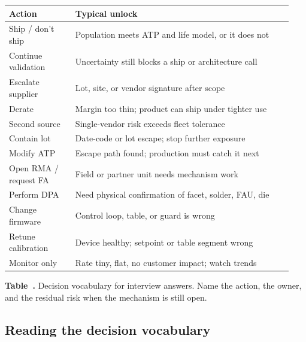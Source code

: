 \begin{table}[ht]
\label{tab:interview-decisions}%
\centering
\setlength{\tabcolsep}{4pt}%
\footnotesize
\renewcommand{\arraystretch}{1.25}%
\begin{tabular}{@{}p{0.22\linewidth}p{0.72\linewidth}@{}}
\toprule
Action & Typical unlock \\
\midrule
Ship / don't ship & Population meets ATP and life model, or it does not \\
\addlinespace[1.5em]
Continue validation & Uncertainty still blocks a ship or architecture call \\
\addlinespace[1.5em]
Escalate supplier & Lot, site, or vendor signature after scope \\
\addlinespace[1.5em]
Derate & Margin too thin; product can ship under tighter use \\
\addlinespace[1.5em]
Second source & Single-vendor risk exceeds fleet tolerance \\
\addlinespace[1.5em]
Contain lot & Date-code or lot escape; stop further exposure \\
\addlinespace[1.5em]
Modify ATP & Escape path found; production must catch it next \\
\addlinespace[1.5em]
Open RMA / request FA & Field or partner unit needs mechanism work \\
\addlinespace[1.5em]
Perform DPA & Need physical confirmation of facet, solder, FAU, die \\
\addlinespace[1.5em]
Change firmware & Control loop, table, or guard is wrong \\
\addlinespace[1.5em]
Retune calibration & Device healthy; setpoint or table segment wrong \\
\addlinespace[1.5em]
Monitor only & Rate tiny, flat, no customer impact; watch trends \\
\bottomrule
\end{tabular}
\par\medskip
{\raggedright\footnotesize\textbf{Table~\thetable.} Decision vocabulary for
interview answers. Name the action, the owner, and the residual risk when the
mechanism is still open.\par}
\end{table}
\FloatBarrier

\subsection{Reading the decision vocabulary}
\label{sec:interview-decisions-read}

